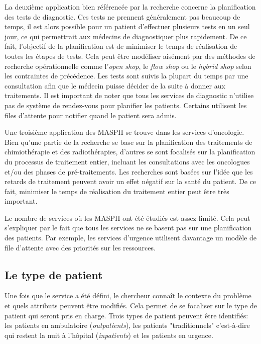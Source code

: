 \documentclass{polytech/polytech}
\begin{document}
La deuxième application bien référencée par la recherche concerne la planification des tests de diagnostic. Ces tests ne prennent généralement pas beaucoup de temps, il est alors possible pour un patient d'effectuer plusieurs tests en un seul jour, ce qui permettrait aux médecins de diagnostiquer plus rapidement. De ce fait, l'objectif de la planification est de minimiser le temps de réalisation de toutes les étapes de tests. Cela peut être modéliser aisément par des méthodes de recherche opérationnelle comme l'\textit{open shop}, le \textit{flow shop} ou le \textit{hybrid shop} selon les contraintes de précédence. Les tests sont suivis la plupart du temps par une consultation afin que le médecin puisse décider de la suite à donner aux traitements. Il est important de noter que tous les services de diagnostic n'utilise pas de système de rendez-vous pour planifier les patients. Certains utilisent les files d'attente pour notifier quand le patient sera admis. 

Une troisième application des MASPH se trouve dans les services d'oncologie. Bien qu'une partie de la recherche se base sur la planification des traitements de chimiothérapie et des radiothérapies, d'autres se sont focalisés sur la planification du processus de traitement entier, incluant les consultations avec les oncologues et/ou des phases de pré-traitements. Les recherches sont basées sur l'idée que les retards de traitement peuvent avoir un effet négatif sur la santé du patient. De ce fait, minimiser le temps de réalisation du traitement entier peut être très important. 

Le nombre de services où les MASPH ont été étudiés est assez limité. Cela peut s'expliquer par le fait que tous les services ne se basent pas sur une planification des patients. Par exemple, les services d'urgence utilisent davantage un modèle de file d'attente avec des priorités sur les ressources. 

\subsection{Le type de patient}

Une fois que le service a été défini, le chercheur connaît le contexte du problème et quels attributs peuvent être modifiés. Cela permet de se focaliser sur le type de patient qui seront pris en charge. Trois types de patient peuvent être identifiés: les patients en ambulatoire (\textit{outpatients}), les patients "traditionnels" c'est-à-dire qui restent la nuit à l'hôpital (\textit{inpatients}) et les patients en urgence.
\end{document}

